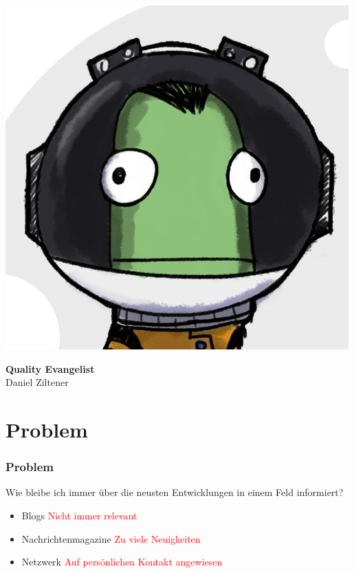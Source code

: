 \documentclass{beamer}
\begin{document}
\begin{frame}
\begin{minipage}{.2\textwidth}
    \includegraphics[height=.2\textheight]{balz}
  \end{minipage}%
  \hfill
  \begin{minipage}{.8\textwidth}
    \textbf{Quality Evangelist} \\ Daniel Ziltener \\    
  \end{minipage}
\end{frame}

\section{Problem}
\begin{frame}
  \frametitle{Problem} \pause
  Wie bleibe ich immer über die neusten Entwicklungen in einem Feld informiert? \pause
    \begin{itemize}
       \item Blogs \pause \textcolor{red}{Nicht immer relevant} \pause
       \item Nachrichtenmagazine \pause \textcolor{red}{Zu viele Neuigkeiten} \pause
       \item Netzwerk \pause \textcolor{red}{Auf persönlichen Kontakt angewiesen}
    \end{itemize}       
\end{frame}  
\end{document}
